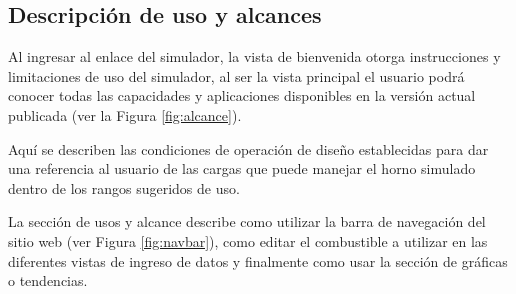 \subsection{Descripción de uso y alcances}
\par Al ingresar al enlace del simulador, la vista de bienvenida otorga instrucciones y limitaciones de uso del simulador, al ser la vista principal el usuario podrá conocer todas las capacidades y aplicaciones disponibles en la versión actual publicada (ver la Figura \ref{fig:alcance}).
\par Aquí se describen las condiciones de operación de diseño establecidas para dar una referencia al usuario de las cargas que puede manejar el horno simulado dentro de los rangos sugeridos de uso.

\par La sección de usos y alcance describe como utilizar la barra de navegación del sitio web (ver Figura \ref{fig:navbar}), como editar el combustible a utilizar en las diferentes vistas de ingreso de datos y finalmente como usar la sección de gráficas o tendencias.

